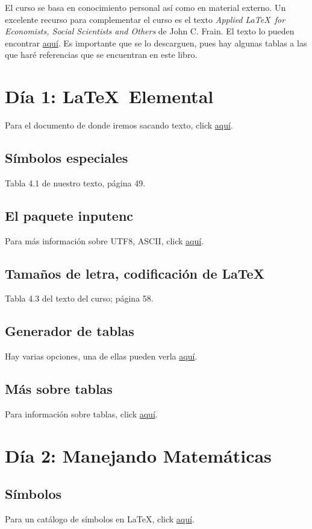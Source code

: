 \documentclass[a4paper]{article}
\begin{document}
El curso se basa en conocimiento personal así como en material externo. Un excelente recurso para complementar el curso es el texto \textit{Applied \LaTeX\ for Economists, Social Scientists and Others} de John C. Frain. El texto lo pueden encontrar \href{https://ideas.repec.org/p/tcd/tcduee/tep0214.html}{aquí}. Es importante que se lo descarguen, pues hay algunas tablas a las que haré referencias que se encuentran en este libro. 


\section{Día 1: \LaTeX\  Elemental}
Para el documento de donde iremos sacando texto, click \href{https://tinyurl.com/textodia1}{aquí}.
\subsection{Símbolos especiales}
Tabla 4.1 de nuestro texto, página 49. 
\subsection{El paquete \textsf{inputenc}}
Para más información sobre UTF8, ASCII, click
\href{https://tinyurl.com/inputenc}{aquí}.
\subsection{Tamaños de letra, codificación de \LaTeX}
Tabla 4.3 del texto del curso; página 58.
\subsection{Generador de tablas}
Hay varias opciones, una de ellas pueden verla \href{https://www.tablesgenerator.com/}{aquí}.
\subsection{Más sobre tablas}
Para información sobre tablas, click \href{https://www.overleaf.com/learn/latex/tables}{aquí}.
\section{Día 2: Manejando Matemáticas}
\subsection{Símbolos}
Para un catálogo de símbolos en \LaTeX, click \href{http://tug.ctan.org/info/symbols/comprehensive/symbols-a4.pdf}{aquí}.
\end{document}
